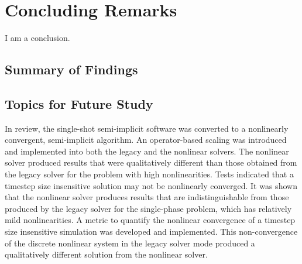 \chapter{Concluding Remarks}
\label{chap:end}
I am a conclusion.

\section{Summary of Findings}
\label{sect:end:summary}


\section{Topics for Future Study}
\label{sect:end:future}

In review, the single-shot semi-implicit \cobra{} software was converted to a nonlinearly convergent, semi-implicit algorithm.
An operator-based scaling was introduced and implemented into both the legacy and the nonlinear \cobra{} solvers.
The nonlinear solver produced results that were qualitatively different than those obtained from the legacy solver for the problem with high nonlinearities.
Tests indicated that a timestep size insensitive solution may not be nonlinearly converged.
It was shown that the nonlinear solver produces results that are indistinguishable from those produced by the legacy solver for the single-phase problem, which has relatively mild nonlinearities.
A metric to quantify the nonlinear convergence of a timestep size insensitive simulation was developed and implemented.
This non-convergence of the discrete nonlinear system in the legacy solver mode produced a qualitatively different solution from the nonlinear solver.

